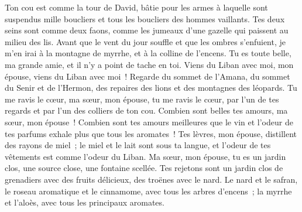 \begin{multicols}{2}
Ton cou est comme la tour de David, bâtie pour les armes à laquelle sont suspendus mille boucliers et tous les boucliers des hommes vaillants.
Tes deux seins sont comme deux faons, comme les jumeaux d'une gazelle qui paissent au milieu des lis.
Avant que le vent du jour souffle et que les ombres s'enfuient, je m'en irai à la montagne de myrrhe, et à la colline de l'encens.
Tu es toute belle, ma grande amie, et il n'y a point de tache en toi.
Viens du Liban avec moi, mon épouse, viens du Liban avec moi~! Regarde du sommet de l'Amana, du sommet du Senir et de l'Hermon, des repaires des lions et des montagnes des léopards.
Tu me ravis le cœur, ma sœur, mon épouse, tu me ravis le cœur, par l'un de tes regards et par l'un des colliers de ton cou.
Combien sont belles tes amours, ma sœur, mon épouse~! Combien sont tes amours meilleures que le vin et l'odeur de tes parfums exhale plus que tous les aromates~!
Tes lèvres, mon épouse, distillent des rayons de miel~; le miel et le lait sont sous ta langue, et l'odeur de tes vêtements est comme l'odeur du Liban.
Ma sœur, mon épouse, tu es un jardin clos, une source close, une fontaine scellée.
Tes rejetons sont un jardin clos de grenadiers avec des fruits délicieux, des troënes avec le nard.
Le nard et le safran, le roseau aromatique et le cinnamome, avec tous les arbres d'encens~; la myrrhe et l'aloès, avec tous les principaux aromates.

\end{multicols}
